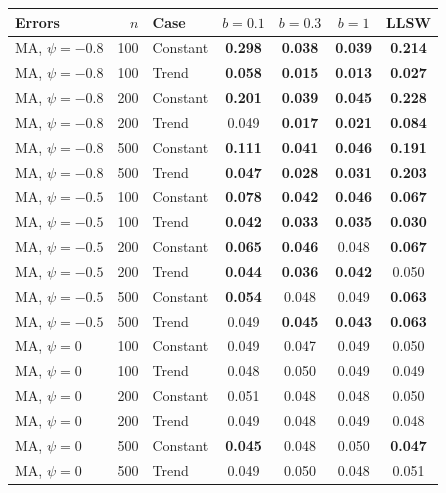 \begin{tabular}{lrlcccc}
\toprule
Errors & $n$ & Case & $b = 0.1$ & $b = 0.3$ & $b = 1$ & LLSW \\
\midrule
MA, $\psi = -0.8$ & 100 & Constant & \textbf{0.298} & \textbf{0.038} & \textbf{0.039} & \textbf{0.214} \\
MA, $\psi = -0.8$ & 100 & Trend & \textbf{0.058} & \textbf{0.015} & \textbf{0.013} & \textbf{0.027} \\
MA, $\psi = -0.8$ & 200 & Constant & \textbf{0.201} & \textbf{0.039} & \textbf{0.045} & \textbf{0.228} \\
MA, $\psi = -0.8$ & 200 & Trend & 0.049 & \textbf{0.017} & \textbf{0.021} & \textbf{0.084} \\
MA, $\psi = -0.8$ & 500 & Constant & \textbf{0.111} & \textbf{0.041} & \textbf{0.046} & \textbf{0.191} \\
MA, $\psi = -0.8$ & 500 & Trend & \textbf{0.047} & \textbf{0.028} & \textbf{0.031} & \textbf{0.203} \\
\addlinespace
MA, $\psi = -0.5$ & 100 & Constant & \textbf{0.078} & \textbf{0.042} & \textbf{0.046} & \textbf{0.067} \\
MA, $\psi = -0.5$ & 100 & Trend & \textbf{0.042} & \textbf{0.033} & \textbf{0.035} & \textbf{0.030} \\
MA, $\psi = -0.5$ & 200 & Constant & \textbf{0.065} & \textbf{0.046} & 0.048 & \textbf{0.067} \\
MA, $\psi = -0.5$ & 200 & Trend & \textbf{0.044} & \textbf{0.036} & \textbf{0.042} & 0.050 \\
MA, $\psi = -0.5$ & 500 & Constant & \textbf{0.054} & 0.048 & 0.049 & \textbf{0.063} \\
MA, $\psi = -0.5$ & 500 & Trend & 0.049 & \textbf{0.045} & \textbf{0.043} & \textbf{0.063} \\
\addlinespace
MA, $\psi = 0$ & 100 & Constant & 0.049 & 0.047 & 0.049 & 0.050 \\
MA, $\psi = 0$ & 100 & Trend & 0.048 & 0.050 & 0.049 & 0.049 \\
MA, $\psi = 0$ & 200 & Constant & 0.051 & 0.048 & 0.048 & 0.050 \\
MA, $\psi = 0$ & 200 & Trend & 0.049 & 0.048 & 0.049 & 0.048 \\
MA, $\psi = 0$ & 500 & Constant & \textbf{0.045} & 0.048 & 0.050 & \textbf{0.047} \\
MA, $\psi = 0$ & 500 & Trend & 0.049 & 0.050 & 0.048 & 0.051 \\

\end{tabular}
